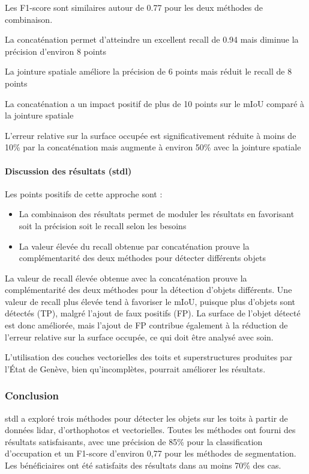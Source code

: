 {{{{Les F1-score sont similaires autour de 0.77 pour les deux méthodes de combinaison.

La concaténation permet d'atteindre un excellent recall de 0.94 mais diminue la précision d'environ 8 points

La jointure spatiale améliore la précision de 6 points mais réduit le recall de 8 points

La concaténation a un impact positif de plus de 10 points sur le mIoU comparé à la jointure spatiale

L'erreur relative sur la surface occupée est significativement réduite à moins de 10\% par la concaténation mais augmente à environ 50\% avec la jointure spatiale

\paragraph{Discussion des résultats (\acrshort{stdl})}

Les points positifs de cette approche sont :
\begin{itemize}
\item La combinaison des résultats permet de moduler les résultats en favorisant soit la précision soit le recall selon les besoins
\item La valeur élevée du recall obtenue par concaténation prouve la complémentarité des deux méthodes pour détecter différents objets
\end{itemize}

La valeur de recall élevée obtenue avec la concaténation prouve la complémentarité des deux méthodes pour la détection d'objets différents. Une valeur de recall plus élevée tend à favoriser le mIoU, puisque plus d'objets sont détectés (TP), malgré l'ajout de faux positifs (FP). La surface de l'objet détecté est donc améliorée, mais l'ajout de FP contribue également à la réduction de l'erreur relative sur la surface occupée, ce qui doit être analysé avec soin.

L'utilisation des couches vectorielles des toits et superstructures produites par l'État de Genève, bien qu'incomplètes, pourrait améliorer les résultats.

\subsubsection{Conclusion}

\acrshort{stdl} a exploré trois méthodes pour détecter les objets sur les toits à partir de données \gls{lidar}, d'orthophotos et vectorielles. Toutes les méthodes ont fourni des résultats satisfaisants, avec une précision de 85\% pour la classification d'occupation et un F1-score d'environ 0,77 pour les méthodes de segmentation. Les bénéficiaires ont été satisfaits des résultats dans au moins 70\% des cas.

}}}}
